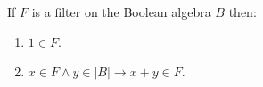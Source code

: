 If $F$ is a filter on the Boolean algebra $B$ then:
\begin{enumerate}
\item $1 \in F$.
\item $x \in F \land y \in |B| \rightarrow x + y \in F$.
\end{enumerate}

